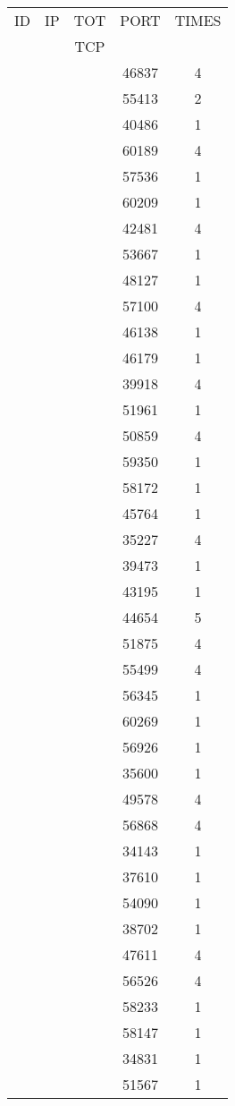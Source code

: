 \documentclass[a4paper]{scrartcl}
\begin{document}
\begin{minipage}[b]{0.5\linewidth}
\begin{tabular}{| c | c | c | c | c |}
\hline
ID & IP & TOT & PORT & TIMES \\ 
   &    & TCP &      &       \\ 
\hline
& & & 46837 & 4 \\ & & & 55413 & 2 \\ & & & 40486 & 1 \\ & & & 60189 & 4 \\ & & & 57536 & 1 \\ & & & 60209 & 1 \\ & & & 42481 & 4 \\ & & & 53667 & 1 \\ & & & 48127 & 1 \\ & & & 57100 & 4 \\ & & & 46138 & 1 \\ & & & 46179 & 1 \\ & & & 39918 & 4 \\ & & & 51961 & 1 \\ & & & 50859 & 4 \\ & & & 59350 & 1 \\ & & & 58172 & 1 \\ & & & 45764 & 1 \\ & & & 35227 & 4 \\ & & & 39473 & 1 \\ & & & 43195 & 1 \\ & & & 44654 & 5 \\ & & & 51875 & 4 \\ & & & 55499 & 4 \\ & & & 56345 & 1 \\ & & & 60269 & 1 \\ & & & 56926 & 1 \\ & & & 35600 & 1 \\ & & & 49578 & 4 \\ & & & 56868 & 4 \\ & & & 34143 & 1 \\ & & & 37610 & 1 \\ & & & 54090 & 1 \\ & & & 38702 & 1 \\ & & & 47611 & 4 \\ & & & 56526 & 4 \\ & & & 58233 & 1 \\ & & & 58147 & 1 \\ & & & 34831 & 1 \\ & & & 51567 & 1 \\ \hline\end{tabular}\end{minipage} \hfill\begin{minipage}[b]{0.5\linewidth}\begin{tabular}{| c | c | c | c | c |}

\end{tabular}
\end{minipage}
\end{document}
